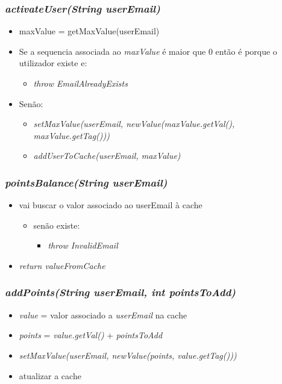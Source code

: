 \documentclass[a4paper]{article}
\begin{document}
\subsubsection{\textit{activateUser(String userEmail)}}
\begin{itemize}
\item maxValue = getMaxValue(userEmail)
\item Se a sequencia associada ao \textit{maxValue} é maior que 0 então é porque o utilizador existe e:
\begin{itemize}
\item \textit{throw EmailAlreadyExists}
\end{itemize}
\item Senão:
\begin{itemize}
\item \textit{setMaxValue(userEmail, newValue(maxValue.getVal(), maxValue.getTag()))}
\item \textit{addUserToCache(userEmail, maxValue)}
\end{itemize}
\end{itemize}
\subsubsection{\textit{pointsBalance(String userEmail)}}
\begin{itemize}
\item vai buscar o valor associado ao userEmail à cache
\begin{itemize}
\item senão existe:
\begin{itemize}
\item \textit{throw InvalidEmail}
\end{itemize}
\end{itemize}
\item \textit{return valueFromCache}
\end{itemize}
\subsubsection{\textit{addPoints(String userEmail, int pointsToAdd)}}
\begin{itemize}
\item \textit{value} = valor associado a \textit{userEmail} na cache
\item \textit{points} = \textit{value.getVal()} + \textit{pointsToAdd}
\item \textit{setMaxValue(userEmail, newValue(points, value.getTag()))}
\item atualizar a cache
\end{itemize}
\end{document}
